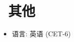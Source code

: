 \documentclass{resume}
\begin{document}

\section{\faInfo\ 其他}
\begin{itemize}[parsep=0.5ex]
  \item 语言: 英语 (CET-6)
\end{itemize}

%
%
\end{document}
